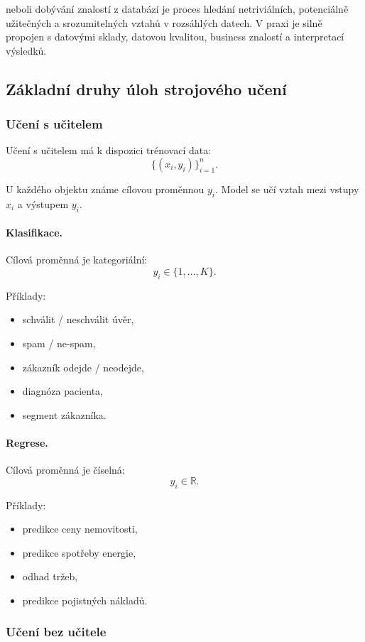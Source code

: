  neboli dobývání znalostí z databází je proces hledání netriviálních, potenciálně
užitečných a srozumitelných vztahů v rozsáhlých datech. V praxi je silně propojen s datovými sklady,
datovou kvalitou, business znalostí a interpretací výsledků.

\subsection{Základní druhy úloh strojového učení}

\subsubsection{Učení s učitelem}

Učení s učitelem má k dispozici trénovací data:
\[
\{(x_i,y_i)\}_{i=1}^n.
\]

U každého objektu známe cílovou proměnnou $y_i$. Model se učí vztah mezi vstupy $x_i$ a výstupem $y_i$.

\paragraph{Klasifikace.}
Cílová proměnná je kategoriální:
\[
y_i \in \{1,\ldots,K\}.
\]

Příklady:
\begin{itemize}
    \item schválit / neschválit úvěr,
    \item spam / ne-spam,
    \item zákazník odejde / neodejde,
    \item diagnóza pacienta,
    \item segment zákazníka.
\end{itemize}

\paragraph{Regrese.}
Cílová proměnná je číselná:
\[
y_i \in \mathbb{R}.
\]

Příklady:
\begin{itemize}
    \item predikce ceny nemovitosti,
    \item predikce spotřeby energie,
    \item odhad tržeb,
    \item predikce pojistných nákladů.
\end{itemize}

\subsubsection{Učení bez učitele}


